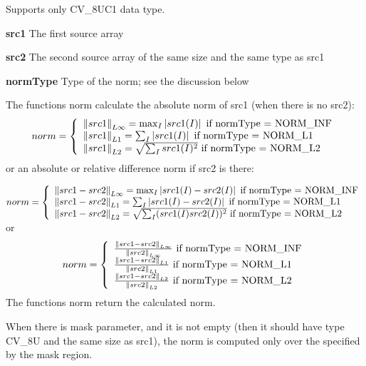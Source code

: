 \documentclass{article}
\begin{document}
Supports only CV{\_}8UC1 data type.

\textbf{src1 }The first source array

\textbf{src2 }The second source array of the same size and the same type as
src1

\textbf{normType }Type of the norm; see the discussion below

The functions norm calculate the absolute norm of src1 (when there is no
src2):
\[
norm=\left\{ {{\begin{array}{*{20}c}
 {\left\| {src1} \right\|_{L\infty } =\max _I \left| {src1(I)} \right|\mbox{
if normType = NORM\_INF}} \hfill \\
 {\left\| {src1} \right\|_{L1} =\sum _I \left| {src1(I)} \right|\mbox{ if
normType = NORM\_L1}} \hfill \\
 {\left\| {src1} \right\|_{L2} =\sqrt {\sum _I src1(I)^2} \mbox{ if normType
= NORM\_L2}} \hfill \\
\end{array} }} \right.
\]
or an absolute or relative difference norm if src2 is there:

$norm=\left\{ {{\begin{array}{*{20}c}
 {\left\| {src1-src2} \right\|_{L\infty } =\max _I \left| {src1(I)-src2(I)}
\right|\mbox{ if normType = NORM\_INF}} \hfill \\
 {\left\| {src1-src2} \right\|_{L1} =\sum _I \left| {src1(I)-src2(I)}
\right|\mbox{ if normType = NORM\_L1}} \hfill \\
 {\left\| {src1-src2} \right\|_{L2} =\sqrt {\sum _I (src1(I)src2(I))^2}
\mbox{ if normType = NORM\_L2}} \hfill \\
\end{array} }} \right.$ or
\[
norm=\left\{ {{\begin{array}{*{20}c}
 {\frac{\left\| {src1-src2} \right\|_{L\infty } }{\left\| {src2}
\right\|_{L\infty } }\mbox{ if normType = NORM\_INF}} \hfill \\
 {\frac{\left\| {src1-src2} \right\|_{L1} }{\left\| {src2} \right\|_{L1}
}\mbox{ if normType = NORM\_L1}} \hfill \\
 {\frac{\left\| {src1-src2} \right\|_{L2} }{\left\| {src2} \right\|_{L2}
}\mbox{ if normType = NORM\_L2}} \hfill \\
\end{array} }} \right.
\]
The functions norm return the calculated norm.

When there is mask parameter, and it is not empty (then it should have type
CV{\_}8U and the same size as src1), the norm is computed only over the
specified by the mask region.
\end{document}
